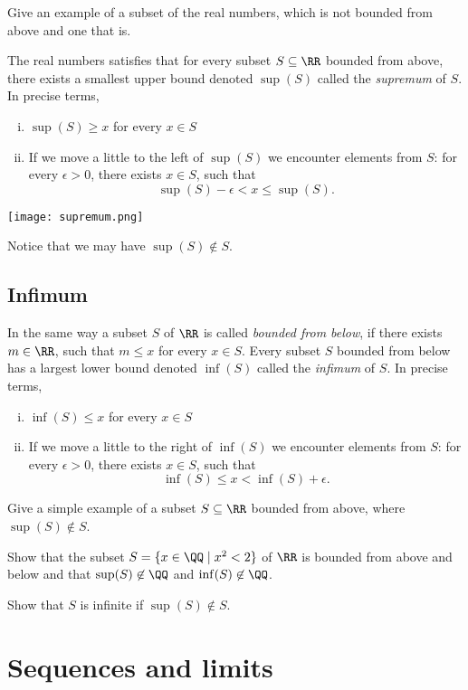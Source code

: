 \documentclass{article}
\begin{document}
\beginshex
Give an example of a subset of the real numbers, which is not bounded from
above and one that is.
\endshex


The real numbers satisfies that for every subset $S\subseteq \RR$ bounded from above,
 there exists a smallest upper bound denoted $\sup(S)$ called
the \emph{supremum} of $S$. In precise terms,
\begin{enumerate}[(i)]
\item
  $\sup(S)\geq x$ for every $x\in S$ 
\item
  If we move a little to the left of $\sup(S)$ we encounter
  elements from $S$: for every $\epsilon > 0$, there exists $x\in S$,
  such that
  $$
  \sup(S)-\epsilon < x \leq \sup(S).
  $$
\end{enumerate}

\texttt{[image: supremum.png]}

Notice that we may have $\sup(S)\not\in S$.

\subsection{Infimum}

In the same way a subset $S$ of $\RR$ is called \emph{bounded from below}, if
there exists $m\in \RR$, such that $m \leq x$ for
every $x\in S$. Every subset $S$ bounded from below has
a largest lower bound denoted $\inf(S)$ called the \emph{infimum} of $S$.
In precise terms,
\begin{enumerate}[(i)]
\item
  $\inf(S)\leq x$ for every $x\in S$ 
\item
  If we move a little to the right of $\inf(S)$ we encounter
  elements from $S$: for every $\epsilon > 0$, there exists $x\in S$,
  such that
  $$
  \inf(S) \leq x < \inf(S) + \epsilon.
  $$
\end{enumerate}


\beginshex
Give a simple example of a subset $S\subseteq \RR$ bounded from above, where
$\sup(S)\not\in S$.

Show that the subset $S = \{x\in \QQ \mid x^2 < 2\}$ of $\RR$ is bounded from above and below and
  that $\sup(S)\not\in \QQ$ and $\inf(S)\not\in \QQ$.
\endshex

\beginshex
Show that $S$ is infinite if $\sup(S)\not\in S$.
\endshex

  \section{Sequences and limits}
\end{document}
